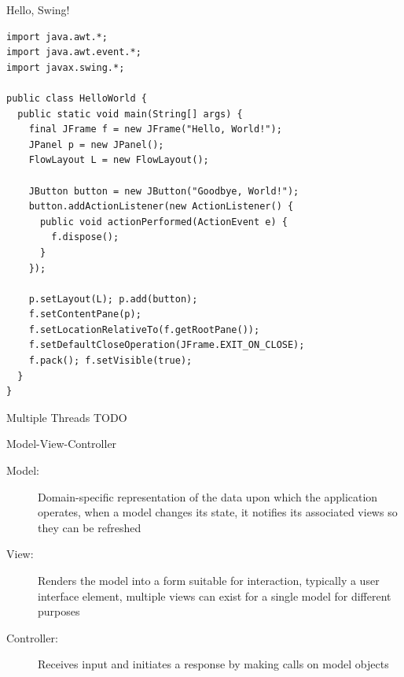 \begin{frame}[fragile]{Hello, Swing!}
\begin{lstlisting}[basicstyle=\fontsize{7}{9}\selectfont\ttfamily]
import java.awt.*;
import java.awt.event.*;
import javax.swing.*;

public class HelloWorld {
  public static void main(String[] args) {
    final JFrame f = new JFrame("Hello, World!");
    JPanel p = new JPanel();
    FlowLayout L = new FlowLayout();

    JButton button = new JButton("Goodbye, World!");
    button.addActionListener(new ActionListener() {
      public void actionPerformed(ActionEvent e) {
        f.dispose();
      }
    });

    p.setLayout(L); p.add(button);
    f.setContentPane(p);
    f.setLocationRelativeTo(f.getRootPane());
    f.setDefaultCloseOperation(JFrame.EXIT_ON_CLOSE);
    f.pack(); f.setVisible(true);
  }
}
\end{lstlisting}
\end{frame}

\begin{frame}[fragile]{Multiple Threads}
  TODO
\end{frame}

\begin{frame}{Model-View-Controller}
  \begin{description}
  \item[Model:] Domain-specific representation of the data upon which
    the application operates, when a model changes its state, it
    notifies its associated views so they can be refreshed
  \item[View:] Renders the model into a form suitable for interaction,
    typically a user interface element, multiple views can exist for a
    single model for different purposes
  \item[Controller:] Receives input and initiates a response by making
    calls on model objects
  \end{description}
\end{frame}

